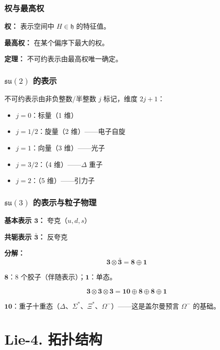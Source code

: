 \subsubsection{权与最高权}

\textbf{权：} 表示空间中 $H \in \mathfrak{h}$ 的特征值。

\textbf{最高权：} 在某个偏序下最大的权。

\textbf{定理：} 不可约表示由最高权唯一确定。

\subsubsection{$\mathfrak{su}(2)$ 的表示}

不可约表示由非负整数/半整数 $j$ 标记，维度 $2j + 1$：
\begin{itemize}
  \item $j = 0$：标量（1 维）
  \item $j = 1/2$：旋量（2 维）——电子自旋
  \item $j = 1$：向量（3 维）——光子
  \item $j = 3/2$：（4 维）——$\Delta$ 重子
  \item $j = 2$：（5 维）——引力子
\end{itemize}

\subsubsection{$\mathfrak{su}(3)$ 的表示与粒子物理}

\textbf{基本表示 $\mathbf{3}$：} 夸克（$u, d, s$）

\textbf{共轭表示 $\bar{\mathbf{3}}$：} 反夸克

\textbf{分解：}
\[
\mathbf{3} \otimes \bar{\mathbf{3}} = \mathbf{8} \oplus \mathbf{1}
\]

$\mathbf{8}$：8 个胶子（伴随表示）；$\mathbf{1}$：单态。

\[
\mathbf{3} \otimes \mathbf{3} \otimes \mathbf{3} = \mathbf{10} \oplus \mathbf{8} \oplus \mathbf{8} \oplus \mathbf{1}
\]

$\mathbf{10}$：重子十重态（$\Delta$、$\Sigma^*$、$\Xi^*$、$\Omega^-$）——这是盖尔曼预言 $\Omega^-$ 的基础。

\section{Lie-4. 拓扑结构}

